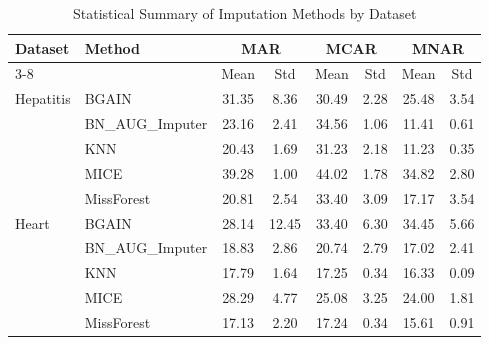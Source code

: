 \begin{table}[t]
\centering
\caption{Statistical Summary of Imputation Methods by Dataset}
\begin{tabular}{llcccccc}
\hline
Dataset & Method & \multicolumn{2}{c}{MAR} & \multicolumn{2}{c}{MCAR} & \multicolumn{2}{c}{MNAR} \\
\cline{3-8}
& & Mean & Std & Mean & Std & Mean & Std \\
\hline
Hepatitis & BGAIN & 31.35 & 8.36 & 30.49 & 2.28 & 25.48 & 3.54 \\
 & BN_AUG_Imputer & 23.16 & 2.41 & 34.56 & 1.06 & 11.41 & 0.61 \\
 & KNN & 20.43 & 1.69 & 31.23 & 2.18 & 11.23 & 0.35 \\
 & MICE & 39.28 & 1.00 & 44.02 & 1.78 & 34.82 & 2.80 \\
 & MissForest & 20.81 & 2.54 & 33.40 & 3.09 & 17.17 & 3.54 \\
\hline
Heart & BGAIN & 28.14 & 12.45 & 33.40 & 6.30 & 34.45 & 5.66 \\
 & BN_AUG_Imputer & 18.83 & 2.86 & 20.74 & 2.79 & 17.02 & 2.41 \\
 & KNN & 17.79 & 1.64 & 17.25 & 0.34 & 16.33 & 0.09 \\
 & MICE & 28.29 & 4.77 & 25.08 & 3.25 & 24.00 & 1.81 \\
 & MissForest & 17.13 & 2.20 & 17.24 & 0.34 & 15.61 & 0.91 \\
\hline
\end{tabular}
\label{tab:method_statistics}
\end{table}

